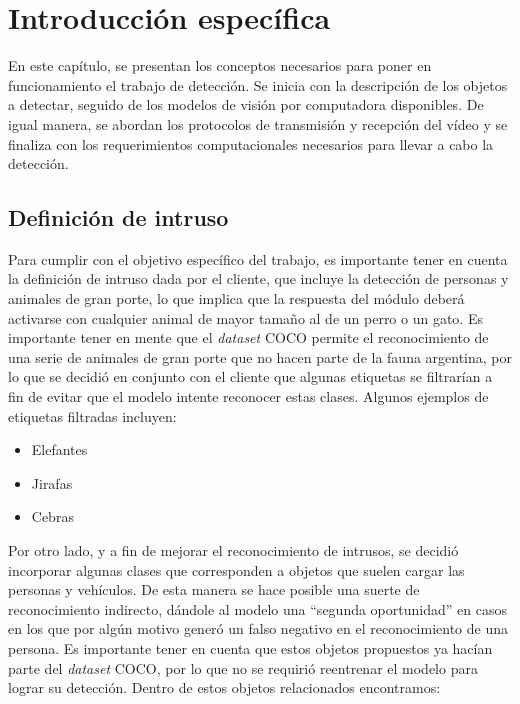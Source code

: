 \chapter{Introducción específica} %

\label{Chapter2}

En este capítulo, se presentan los conceptos necesarios para poner en funcionamiento el trabajo de detección. Se inicia con la descripción de los objetos a detectar, seguido de los modelos de visión por computadora disponibles. De igual manera, se abordan los protocolos de transmisión y recepción del vídeo y se finaliza con los requerimientos computacionales necesarios para llevar a cabo la detección.

\section{Definición de intruso}
Para cumplir con el objetivo específico del trabajo, es importante tener en cuenta la definición de intruso dada por el cliente, que incluye la detección de personas y animales de gran porte, lo que implica que la respuesta del módulo deberá activarse con cualquier animal de mayor tamaño al de un perro o un gato. Es importante tener en mente que el \textit{dataset} COCO permite el reconocimiento de una serie de animales de gran porte que no hacen parte de la fauna argentina, por lo que se decidió en conjunto con el cliente que algunas etiquetas se filtrarían a fin de evitar que el modelo intente reconocer estas clases. Algunos ejemplos de etiquetas filtradas incluyen:

\begin{itemize}
	\item Elefantes
	\item Jirafas
	\item Cebras
\end{itemize}

Por otro lado, y a fin de mejorar el reconocimiento de intrusos, se decidió incorporar algunas clases que corresponden a objetos que suelen cargar las personas y vehículos. De esta manera se hace posible una suerte de reconocimiento indirecto, dándole al modelo una “segunda oportunidad” en casos en los que por algún motivo generó un falso negativo en el reconocimiento de una persona. Es importante tener en cuenta que estos objetos propuestos ya hacían parte del \textit{dataset} COCO, por lo que no se requirió reentrenar el modelo para lograr su detección. Dentro de estos objetos relacionados encontramos: 

